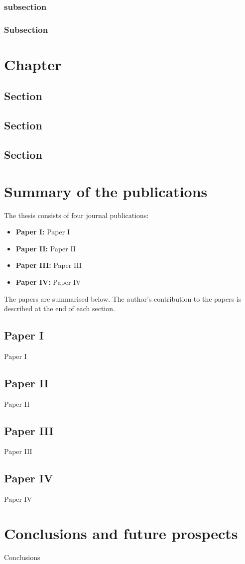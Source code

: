 \documentclass[a4paper,11pt,english]{report}
\begin{document}
\subsection{subsection}

\subsection{Subsection}

\chapter{Chapter}

\section{Section}

\section{Section}

\section{Section}

\chapter{Summary of the publications}
The thesis consists of four journal publications:
\begin{itemize}
  \item \textbf{Paper I:} Paper I
  \item \textbf{Paper II:} Paper II
  \item \textbf{Paper III:} Paper III
  \item \textbf{Paper IV:} Paper IV
\end{itemize}
The papers are summarised below. The author's contribution to the papers is described at the end of each section.

\section{Paper I}
Paper I

\section{Paper II}
Paper II

\section{Paper III}
Paper III

\section{Paper IV}
Paper IV

\chapter{Conclusions and future prospects}
Conclusions




\end{document}
